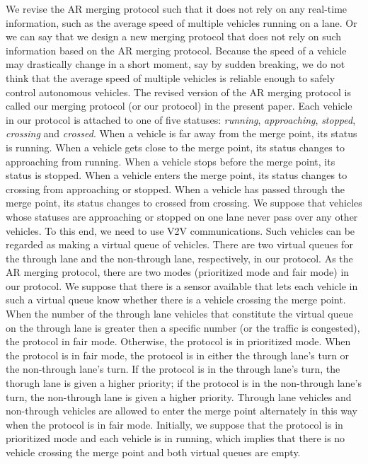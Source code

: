 \documentclass[10pt, conference, compsocconf]{IEEEtran}
\begin{document}
We revise the AR merging protocol such that it does not rely on any
real-time information, such as the average speed of multiple vehicles
running on a lane. Or we can say that we design a new merging protocol
that does not rely on such information based on the AR merging
protocol. Because the speed of a vehicle may drastically change in a
short moment, say by sudden breaking, we do not think that the average
speed of multiple vehicles is reliable enough to safely control
autonomous vehicles. The revised version of the AR merging protocol is
called our merging protocol (or our protocol) in the present paper.
Each vehicle in our protocol is attached to one of five statuses:
\textit{running}, \textit{approaching}, \textit{stopped},
\textit{crossing} and \textit{crossed}.  When a vehicle is far away
from the merge point, its status is running. When a vehicle gets close
to the merge point, its status changes to approaching from
running. When a vehicle stops before the merge point, its status is
stopped. When a vehicle enters the merge point, its status changes to
crossing from approaching or stopped.  When a vehicle has passed
through the merge point, its status changes to crossed from
crossing. We suppose that vehicles whose statuses are approaching or
stopped on one lane never pass over any other vehicles. To this end,
we need to use V2V communications. Such vehicles can be regarded as
making a virtual queue of vehicles. There are two virtual queues for
the through lane and the non-through lane, respectively, in our
protocol. As the AR merging protocol, there are two modes (prioritized
mode and fair mode) in our protocol. We suppose that there is a sensor
available that lets each vehicle in such a virtual queue know whether
there is a vehicle crossing the merge point.  When the number of the
through lane vehicles that constitute the virtual queue on the through
lane is greater then a specific number (or the traffic is congested),
the protocol in fair mode. Otherwise, the protocol is in prioritized
mode.  When the protocol is in fair mode, the protocol is in either
the through lane's turn or the non-through lane's turn. If the
protocol is in the through lane's turn, the thorugh lane is given a
higher priority; if the protocol is in the non-through lane's turn,
the non-through lane is given a higher priority. Through lane vehicles
and non-through vehicles are allowed to enter the merge point
alternately in this way when the protocol is in fair mode. Initially,
we suppose that the protocol is in prioritized mode and each vehicle
is in running, which implies that there is no vehicle crossing the
merge point and both virtual queues are empty.
\end{document}
